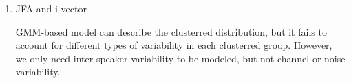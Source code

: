 \begin{enumerate}
      \item JFA and i-vector

        GMM-based model can describe the clusterred distribution, but it fails to account for
        different types of variability in each clusterred group.
        However, we only need inter-speaker variability to be modeled,
        but not channel or noise variability.



  \end{enumerate}

